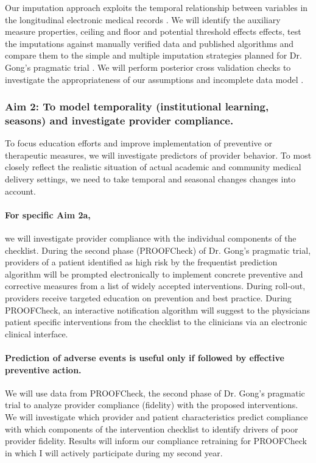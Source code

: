 \documentclass[11pt,notitlepage]{article}
\begin{document}
Our imputation approach exploits the temporal relationship between variables in the longitudinal electronic medical records \cite{Welch24782349}. We will identify the auxiliary measure properties, ceiling and floor and potential threshold effects effects, test the imputations against manually verified data and published algorithms and compare them to the simple and multiple imputation strategies planned for Dr. Gong's pragmatic trial \cite{Huntington_16311133,Sloan_15027501}.  We will perform posterior cross validation checks to investigate the appropriateness of our assumptions and incomplete data model \cite{Gelman1998notasked}.

\subsubsection*{Aim 2: To model temporality (institutional learning, seasons) and investigate provider compliance.}
To focus education efforts and improve implementation of preventive or therapeutic measures, we will investigate predictors of provider behavior. To most closely reflect the realistic situation of actual academic and community medical delivery settings, we need to take temporal and seasonal changes changes into account. 
  
\paragraph*{For specific Aim 2a,} we will investigate provider compliance with the individual components of the checklist. During the second phase (PROOFCheck) of Dr. Gong's pragmatic trial, providers of a patient identified as high risk by the frequentist prediction algorithm will be prompted electronically to implement concrete preventive and corrective measures from a list of widely accepted interventions. During roll-out, providers receive targeted education on prevention and best practice. During PROOFCheck, an interactive notification algorithm will suggest to the physicians patient specific interventions from the checklist to the clinicians via an electronic clinical interface. 

\paragraph*{Prediction of adverse events is useful only if followed by effective preventive action. } We will use data from PROOFCheck, the second phase of Dr. Gong's pragmatic trial to analyze provider compliance (fidelity) with the proposed interventions. We will investigate which provider and patient characteristics predict compliance with which components of the intervention checklist to identify drivers of poor provider fidelity. Results will inform our compliance retraining for PROOFCheck in which I will actively participate during my second year.
\end{document}
